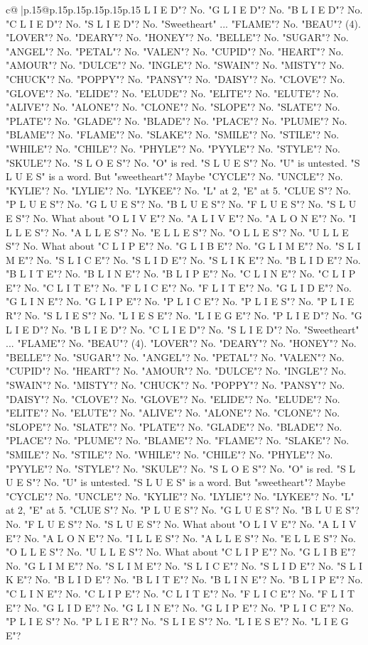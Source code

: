 \documentclass{article}
\begin{document}
{\begin{supertabular}{c@{$\;$}|p{.15\linewidth}@{}p{.15\linewidth}p{.15\linewidth}p{.15\linewidth}p{.15\linewidth}p{.15\linewidth}}
{{{L I E D"? No. "G L I E D"? No. "B L I E D"? No. "C L I E D"? No. "S L I E D"? No. "Sweetheart" ... "FLAME"? No. "BEAU"? (4). "LOVER"? No. "DEARY"? No. "HONEY"? No. "BELLE"? No. "SUGAR"? No. "ANGEL"? No. "PETAL"? No. "VALEN"? No. "CUPID"? No. "HEART"? No. "AMOUR"? No. "DULCE"? No. "INGLE"? No. "SWAIN"? No. "MISTY"? No. "CHUCK"? No. "POPPY"? No. "PANSY"? No. "DAISY"? No. "CLOVE"? No. "GLOVE"? No. "ELIDE"? No. "ELUDE"? No. "ELITE"? No. "ELUTE"? No. "ALIVE"? No. "ALONE"? No. "CLONE"? No. "SLOPE"? No. "SLATE"? No. "PLATE"? No. "GLADE"? No. "BLADE"? No. "PLACE"? No. "PLUME"? No. "BLAME"? No. "FLAME"? No. "SLAKE"? No. "SMILE"? No. "STILE"? No. "WHILE"? No. "CHILE"? No. "PHYLE"? No. "PYYLE"? No. "STYLE"? No. "SKULE"? No. "S L O E S"? No. "O" is red. "S L U E S"? No. "U" is untested. "S L U E S" is a word. But "sweetheart"? Maybe "CYCLE"? No. "UNCLE"? No. "KYLIE"? No. "LYLIE"? No. "LYKEE"? No. "L" at 2, "E" at 5. "CLUE S"? No. "P L U E S"? No. "G L U E S"? No. "B L U E S"? No. "F L U E S"? No. "S L U E S"? No. What about "O L I V E"? No. "A L I V E"? No. "A L O N E"? No. "I L L E S"? No. "A L L E S"? No. "E L L E S"? No. "O L L E S"? No. "U L L E S"? No. What about "C L I P E"? No. "G L I B E"? No. "G L I M E"? No. "S L I M E"? No. "S L I C E"? No. "S L I D E"? No. "S L I K E"? No. "B L I D E"? No. "B L I T E"? No. "B L I N E"? No. "B L I P E"? No. "C L I N E"? No. "C L I P E"? No. "C L I T E"? No. "F L I C E"? No. "F L I T E"? No. "G L I D E"? No. "G L I N E"? No. "G L I P E"? No. "P L I C E"? No. "P L I E S"? No. "P L I E R"? No. "S L I E S"? No. "L I E S E"? No. "L I E G E"? No. "P L I E D"? No. "G L I E D"? No. "B L I E D"? No. "C L I E D"? No. "S L I E D"? No. "Sweetheart" ... "FLAME"? No. "BEAU"? (4). "LOVER"? No. "DEARY"? No. "HONEY"? No. "BELLE"? No. "SUGAR"? No. "ANGEL"? No. "PETAL"? No. "VALEN"? No. "CUPID"? No. "HEART"? No. "AMOUR"? No. "DULCE"? No. "INGLE"? No. "SWAIN"? No. "MISTY"? No. "CHUCK"? No. "POPPY"? No. "PANSY"? No. "DAISY"? No. "CLOVE"? No. "GLOVE"? No. "ELIDE"? No. "ELUDE"? No. "ELITE"? No. "ELUTE"? No. "ALIVE"? No. "ALONE"? No. "CLONE"? No. "SLOPE"? No. "SLATE"? No. "PLATE"? No. "GLADE"? No. "BLADE"? No. "PLACE"? No. "PLUME"? No. "BLAME"? No. "FLAME"? No. "SLAKE"? No. "SMILE"? No. "STILE"? No. "WHILE"? No. "CHILE"? No. "PHYLE"? No. "PYYLE"? No. "STYLE"? No. "SKULE"? No. "S L O E S"? No. "O" is red. "S L U E S"? No. "U" is untested. "S L U E S" is a word. But "sweetheart"? Maybe "CYCLE"? No. "UNCLE"? No. "KYLIE"? No. "LYLIE"? No. "LYKEE"? No. "L" at 2, "E" at 5. "CLUE S"? No. "P L U E S"? No. "G L U E S"? No. "B L U E S"? No. "F L U E S"? No. "S L U E S"? No. What about "O L I V E"? No. "A L I V E"? No. "A L O N E"? No. "I L L E S"? No. "A L L E S"? No. "E L L E S"? No. "O L L E S"? No. "U L L E S"? No. What about "C L I P E"? No. "G L I B E"? No. "G L I M E"? No. "S L I M E"? No. "S L I C E"? No. "S L I D E"? No. "S L I K E"? No. "B L I D E"? No. "B L I T E"? No. "B L I N E"? No. "B L I P E"? No. "C L I N E"? No. "C L I P E"? No. "C L I T E"? No. "F L I C E"? No. "F L I T E"? No. "G L I D E"? No. "G L I N E"? No. "G L I P E"? No. "P L I C E"? No. "P L I E S"? No. "P L I E R"? No. "S L I E S"? No. "L I E S E"? No. "L I E G E"? }}}
\end{supertabular}}
\end{document}
